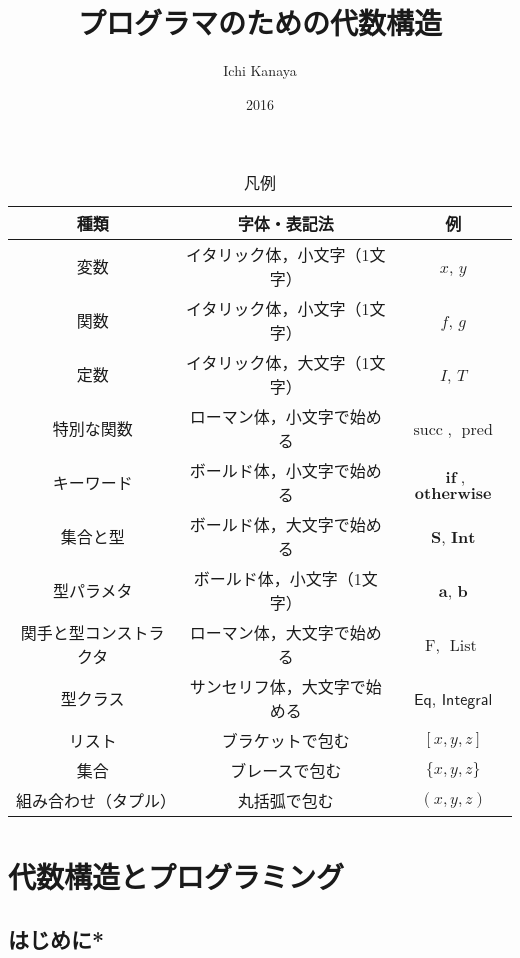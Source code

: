 \documentclass[twocolumn]{jsbook}
\title{プログラマのための代数構造}
\author{Ichi Kanaya}
\date{2016}
\newcommand{\hsklType}[1]{\textbf{#1}}
\newcommand{\hsklTypeclass}[1]{\mathsf{#1}}
\newcommand{\hsklTypeConstructor}[1]{\mathop{\mathrm{#1}}}
\DeclareMathOperator{\hsklListConstructor}{\hsklTypeConstructor{List}}
\DeclareMathOperator{\hsklPred}{pred}
\DeclareMathOperator{\hsklSucc}{succ}
\newcommand{\hsklInt}{\hsklType{Int}}
\newcommand{\hsklIntegral}{\hsklTypeclass{Integral}}
\newcommand{\hsklEq}{\hsklTypeclass{Eq}}
\newcommand{\hsklFunction}[1]{\Hat{#1}}
\newcommand{\hsklList}[1]{\Bar{#1}}
\newcommand{\hsklMaybe}[1]{\Tilde{#1}}
\newcommand{\mathKeyword}[1]{\mathbf{#1}}
\DeclareMathOperator{\mathIf}{\mathKeyword{if}}
\newcommand{\mathOtherwise}{\mathKeyword{otherwise}}
\newcommand{\mathFunctor}[1]{\mathrm{#1}}
\newcommand{\mathSet}[1]{\mathbf{#1}}
\newcommand{\mathVector}[1]{\vec{#1}}
\begin{document}
\maketitle
\tableofcontents

\begin{table*}
\caption{凡例}
\begin{center}
\begin{tabular}{||c|c|c||}
\hline
種類&字体・表記法&例\\
\hline
変数&イタリック体，小文字（1文字）&$x$, $y$\\
関数&イタリック体，小文字（1文字）&$f$, $g$\\
定数&イタリック体，大文字（1文字）&$I$, $T$\\
特別な関数&ローマン体，小文字で始める&$\hsklSucc$, $\hsklPred$\\
キーワード&ボールド体，小文字で始める&$\mathIf$, $\mathOtherwise$\\
集合と型&ボールド体，大文字で始める&$\mathSet{S}$, $\hsklInt$\\
型パラメタ&ボールド体，小文字（1文字）&$\hsklType{a}$, $\hsklType{b}$\\
関手と型コンストラクタ&ローマン体，大文字で始める&$\mathFunctor{F}$, $\hsklListConstructor$\\
型クラス&サンセリフ体，大文字で始める&$\hsklEq$, $\hsklIntegral$\\
\hline
リスト&ブラケットで包む&$[x,y,z]$\\
集合&ブレースで包む&$\{x,y,z\}$\\
組み合わせ（タプル）&丸括弧で包む&$(x,y,z)$\\
\hline
\end{tabular}
\end{center}
\end{table*}


\part{代数構造とプログラミング}

\chapter{はじめに*}
\end{document}
